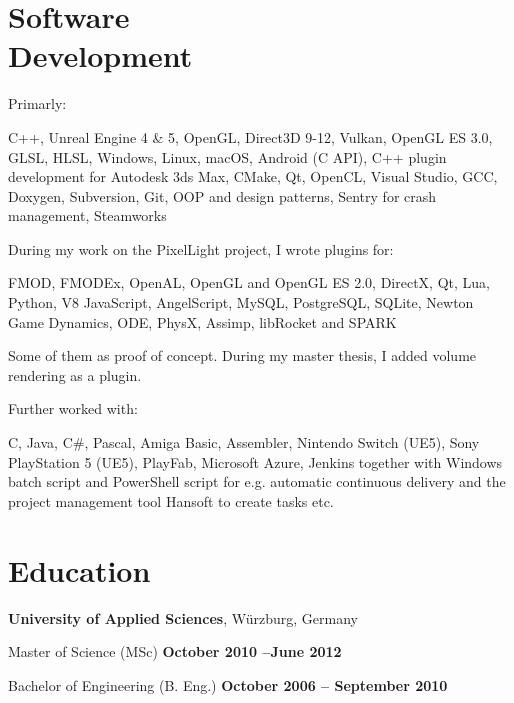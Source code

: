 \documentclass[margin,line]{Ofenberg_Resume}
\begin{document}
\begin{resume}
	\section{\mysidestyle Software\\Development}

	Primarly:
	\begin{list2}
		\item C++, Unreal Engine 4 \& 5, OpenGL, Direct3D 9-12, Vulkan, OpenGL ES 3.0, GLSL, HLSL, Windows, Linux, macOS, Android (C API), C++ plugin development for Autodesk 3ds Max, CMake, Qt, OpenCL, Visual Studio, GCC, Doxygen, Subversion, Git, OOP and design patterns, Sentry for crash management, Steamworks
	\end{list2}\vspace{-1.5mm}

	During my work on the PixelLight project, I wrote plugins for:
	\begin{list2}
		\item FMOD, FMODEx, OpenAL, OpenGL and OpenGL ES 2.0, DirectX,
		Qt, Lua, Python, V8 JavaScript, AngelScript, MySQL, PostgreSQL, SQLite, Newton Game Dynamics, ODE, PhysX, Assimp, libRocket and SPARK
	\end{list2}\vspace{-1.5mm}
	Some of them as proof of concept. During my master thesis, I added volume rendering as a plugin.

	Further worked with:
	\begin{list2}
		\item C, Java, C\#, Pascal, Amiga Basic, Assembler, Nintendo Switch (UE5), Sony PlayStation 5 (UE5), PlayFab, Microsoft Azure, Jenkins together with Windows batch script and PowerShell script for e.g. automatic continuous delivery and the project management tool Hansoft to create tasks etc.
	\end{list2}\vspace{-1.5mm}


	\section{\mysidestyle Education}
	\textbf{University of Applied Sciences}, W\"urzburg, Germany
	\begin{list2}
		\item Master of Science (MSc) \hfill \textbf{October 2010 --June 2012}\vspace{-3mm}\\\vspace{-1mm}%
		\item Bachelor of Engineering (B. Eng.) \hfill \textbf{October 2006 -- September 2010}\vspace{-3mm}\\\vspace{-1mm}%
	\end{list2}\vspace{-1.5mm}



\end{resume}
\end{document}
